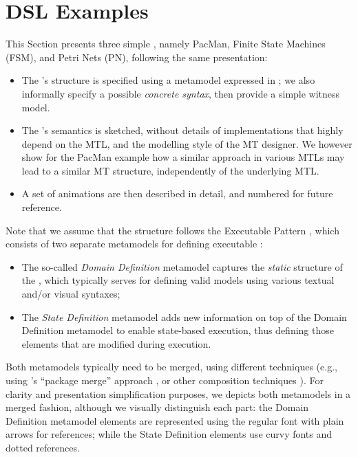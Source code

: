 \section{DSL Examples}
\label{sec:Examples}

This Section presents three simple \DSMLs, namely \textsf{PacMan}, Finite State
Machines (\textsf{FSM}), and Petri Nets (\textsf{PN}), following the same 
presentation:
\begin{itemize}
	\item The \DSL's structure is specified using a metamodel expressed in \MOF;
   we also informally specify a possible \emph{concrete syntax}, then provide a 
   simple witness model.

   \item The \DSL's semantics is sketched, without details of implementations that
   highly depend on the MTL, and the modelling style of the MT designer. We however
   show for the \textsf{PacMan} example how a similar approach in various MTLs 
   may lead to a similar MT structure, independently of the underlying MTL.

   \item A set of animations are then described in detail, and numbered for 
   future reference.
\end{itemize}
Note that we assume that the \DSL structure follows the Executable \DSML Pattern
\citep{Combemale-Cregut-Pantel:2012}, which consists of two separate metamodels for
defining executable \DSMLs:
\begin{itemize}
	\item The so-called \emph{Domain Definition} metamodel captures the 
   \emph{static} structure of the \DSL, which typically serves for defining valid
   models using various textual and/or visual syntaxes;
   
   \item The \emph{State Definition} metamodel adds new information on top of the
   Domain Definition metamodel to enable state-based execution, thus defining those
   elements that are modified during execution.
\end{itemize}
Both metamodels typically need to be merged, using different techniques (e.g.,
using \MOF's ``package merge'' approach \cite{TR:OMG-MOF:2016}, or other 
composition techniques \cite{J:Abouzahra-Sabraoui-Afdel:2020}).
For clarity and presentation simplification purposes, we depicts both metamodels
in a merged fashion, although we visually distinguish each part: the Domain Definition
metamodel elements are represented using the regular font with plain arrows for 
references; while the State Definition elements use curvy fonts and dotted references.








